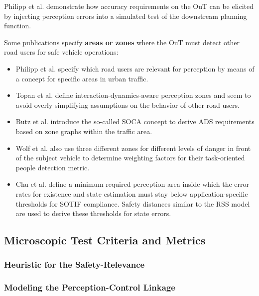 \documentclass[conference]{IEEEtran}
\begin{document}
Philipp et al. \cite{Philipp2021requirements} demonstrate how accuracy requirements on the OuT can be elicited by injecting perception errors into a simulated test of the downstream planning function. 

Some publications specify \textbf{areas or zones} where the OuT must detect other road users for safe vehicle operations: 
\begin{itemize}
\item Philipp et al. \cite{Philipp2022systematization} specify which road users are relevant for perception by means of a concept for specific areas in urban traffic.
\item Topan et al. \cite{Topan2022zones} define interaction-dynamics-aware perception zones and seem to avoid overly simplifying assumptions on the behavior of other road users.
\item Butz et al. \cite{Butz2020soca} introduce the so-called SOCA concept to derive ADS requirements based on zone graphs within the traffic area.
\item Wolf et al. \cite{Wolf2021people} also use three different zones for different levels of danger in front of the subject vehicle to determine weighting factors for their task-oriented people detection metric. 
\item Chu et al. \cite{Chu2023sotif} define a minimum required perception area inside which the error rates for existence and state estimation must stay below application-specific thresholds for SOTIF compliance. Safety distances similar to the RSS model are used to derive these thresholds for state errors.
\end{itemize}




\subsection{Microscopic Test Criteria and Metrics} 
\label{sec:safety_metrics_micro}

\subsubsection{Heuristic for the Safety-Relevance}
\label{sec:heuristic_safety_relevance}



\subsubsection{Modeling the Perception-Control Linkage}
\label{sec:metrics_perc_control_linkage}
\end{document}
